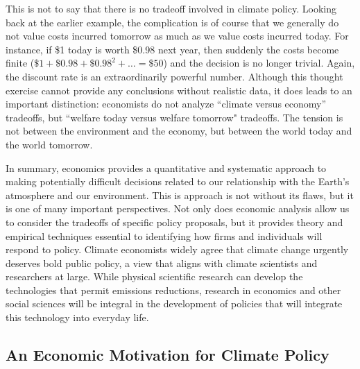This is not to say that there is no tradeoff involved in climate policy. Looking back at the earlier example, the complication is of course that we generally do not value costs incurred tomorrow as much as we value costs incurred today. For instance, if \$1 today is worth \$0.98 next year, then suddenly the costs become finite ($\$1  + \$0.98  + \$0.98^2 + \ldots = \$50$) and the decision is no longer trivial. Again, the discount rate is an extraordinarily powerful number. Although this thought exercise cannot provide any conclusions without realistic data, it does leads to an important distinction: economists do not analyze ``climate versus economy'' tradeoffs, but ``welfare today versus welfare tomorrow" tradeoffs. The tension is not between the environment and the economy, but between the world today and the world tomorrow. 

In summary, economics provides a quantitative and systematic approach to making potentially difficult decisions related to our relationship with the Earth's atmosphere and our environment. This is approach is not without its flaws, but it is one of many important perspectives. Not only does economic analysis allow us to consider the tradeoffs of specific policy proposals, but it provides theory and empirical techniques essential to identifying how firms and individuals will respond to policy. Climate economists widely agree that climate change urgently deserves bold public policy, a view that aligns with climate scientists and researchers at large. While physical scientific research can develop the technologies that permit emissions reductions, research in economics and other social sciences will be integral in the development of policies that will integrate this technology into everyday life.




\subsection{An Economic Motivation for Climate Policy}

